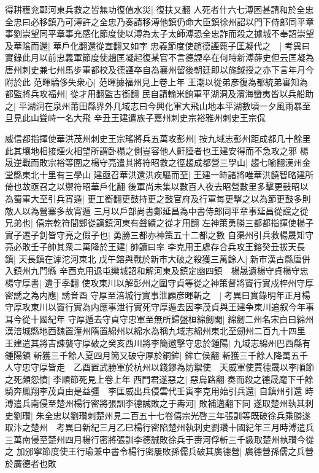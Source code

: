 得耕穫兖鄆河東兵救之皆無功復值水災|{
	復扶又翻}
人死者什六七溥困甚請和於全忠全忠曰必移鎮乃可溥許之全忠乃奏請移溥他鎮仍命大臣鎮徐州詔以門下侍郎同平章事劉崇望同平章事充感化節度使以溥為太子太師溥恐全忠詐而殺之據城不奉詔崇望及華隂而還|{
	華戶化翻還從宣翻又如字}
忠義節度使趙德諲薨子匡凝代之　|{
	考異曰實錄此月以前忠義軍節度使趙匡凝起復某官不言德諲卒在何時新溥薛史但云匡凝為唐州刺史兼七州馬步軍都校及德諲卒自為襄州留後朝廷即以旄鉞授之亦下言年月今附於此}
范暉驕侈失衆心|{
	范暉據福州見上卷上年}
王潮以從弟彦復為都統弟審知為都監將兵攻福州|{
	從才用翻監古銜翻}
民自請輸米餉軍平湖洞及濱海蠻夷皆以兵船助之|{
	平湖洞在泉州莆田縣界外几域志曰今興化軍大飛山地本平湖數頃一夕風雨暴至旦見此山聳峙一名大飛}
辛丑王建遣族子嘉州刺史宗裕雅州刺史王宗侃

威信都指揮使華洪茂州刺史王宗瑤將兵五萬攻彭州|{
	按九域志彭州距成都几十餘里此其壤地相接煙火相望所謂卧榻之側豈容他人鼾腄者也王建安得而不急攻之邪}
楊晟逆戰而敗宗裕等圍之楊守亮遣其將符昭救之徑趨成都營三學山|{
	趨七喻翻漢州金堂縣東北十里有三學山}
建亟召華洪還洪疾驅而至|{
	王建一時諸將唯華洪饒智略建所倚也故亟召之以禦符昭華戶化翻}
後軍尚未集以數百人夜去昭營數里多擊更鼓昭以為蜀軍大至引兵宵遁|{
	更工衡翻更鼓持更之鼓官府及行軍每更撃之以為節更鼓多則敵人以為營寨多故宵遁}
三月以戶部尚書鄭延昌為中書侍郎同平章事延昌從讜之從兄弟也|{
	僖宗乾符間鄭從讜鎮河東有聲績之從才用翻}
左神策勇勝三都都指揮使楊子實子遷子釗皆守亮之假子也|{
	勇勝三都亦神策五十二都之數}
自渠州引兵救楊晟知守亮必敗壬子帥其衆二萬降於王建|{
	帥讀曰率}
李克用王處存合兵攻王鎔癸丑拔天長鎮|{
	天長鎮在滹沱河東北}
戊午鎔與戰於新市大破之殺獲三萬餘人|{
	新市漢古縣唐併入鎮州九門縣}
辛酉克用退屯欒城詔和解河東及鎮定幽四鎮　楊晟遺楊守貞楊守忠楊守厚書|{
	遺于季翻}
使攻東川以解彭州之圍守貞等從之神策督將竇行實戍梓州守厚密誘之為内應|{
	誘音酉}
守厚至涪城行實事泄顧彦暉斬之　|{
	考異曰實錄明年正月楊守厚攻東川以竇行實為内應事泄行實死守厚遁去因李茂貞與王建争東川追叙今年事耳今從十國紀年}
守厚遁去守貞守忠軍至無所歸盤桓綿劒閣|{
	綿劒二州名宋白曰綿州漢涪城縣地西魏置潼州隋置綿州以綿水為稱九域志綿州東北至劒州二百九十四里}
王建遣其將吉諫襲守厚破之癸亥西川將李簡邀擊守忠於鍾陽|{
	九域志綿州巴西縣有鍾陽鎮}
斬獲三千餘人夏四月簡又破守厚於銅鉾|{
	鉾亡侯翻}
斬獲三千餘人降萬五千人守忠守厚皆走　乙酉置武勝軍於杭州以錢鏐為防禦使　天威軍使賈德晟以李順節之死頗怨憤|{
	李順節死見上卷上年}
西門君遂惡之|{
	惡烏路翻}
奏而殺之德晟麾下千餘騎奔鳳翔李茂貞由是益彊　李匡威出兵侵雲代壬寅李克用始引兵還|{
	自鎮州引還}
時溥遣兵南侵至楚州楊行密將張訓李德誠敗之于夀河|{
	敗補邁翻下同}
遂取楚州執其刺史劉瓚|{
	朱全忠以劉瓚刺楚州見二百五十七卷僖宗光啓三年張訓等既破徐兵乘勝遂取汴之楚州　考異曰新紀三月乙巳楊行密陷楚州執刺史劉瓚十國紀年三月時溥遣兵三萬南侵至楚州四月楊行密將張訓李德誠敗徐兵于夀河俘斬三千級取楚州執瓚今從之}
加邠寧節度使王行瑜兼中書令楊行密屢敗孫儒兵破其廣德營|{
	廣德營孫儒之兵營於廣德者也敗}


